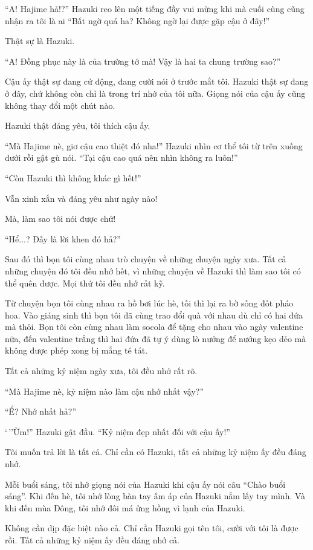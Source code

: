 {``A! Hajime hả!?'' Hazuki reo lên một tiếng đầy vui mừng khi mà cuối
cùng cũng nhận ra tôi là ai ``Bất ngờ quá ha? Không ngờ lại được gặp cậu
ở đây!''

Thật sự là Hazuki.

``A! Đồng phục này là của trường tớ mà! Vậy là hai ta chung trường
sao?''

Cậu ấy thật sự đang cử động, đang cười nói ở trước mắt tôi. Hazuki thật
sự đang ở đây, chứ không còn chỉ là trong trí nhớ của tôi nữa. Giọng nói
của cậu ấy cũng không thay đổi một chút nào.

Hazuki thật đáng yêu, tôi thích cậu ấy.

``Mà Hajime nè, giơ cậu cao thiệt đó nha!'' Hazuki nhìn cơ thể tôi từ
trên xuống dưới rồi gật gù nói. ``Tại cậu cao quá nên nhìn không ra
luôn!''

``Còn Hazuki thì không khác gì hết!''

Vẫn xinh xắn và đáng yêu như ngày nào!

Mà, làm sao tôi nói được chứ!

``Hể...? Đấy là lời khen đó hả?''

Sau đó thì bọn tôi cùng nhau trò chuyện về những chuyện ngày xưa. Tất cả
những chuyện đó tôi đều nhớ hết, vì những chuyện về Hazuki thì làm sao
tôi có thể quên được. Mọi thứ tôi đều nhớ rất kỹ.

Từ chuyện bọn tôi cùng nhau ra hồ bơi lúc hè, tối thì lại ra bờ sống đốt
pháo hoa. Vào giáng sinh thì bọn tôi đã cùng trao đổi quà với nhau dù
chỉ có hai đứa mà thôi. Bọn tôi còn cùng nhau làm socola để tặng cho
nhau vào ngày valentine nữa, đến valentine trắng thì hai đứa đã tự ý
dùng lò nướng để nướng kẹo dẻo mà không được phép xong bị mắng té tát.

Tất cả những kỷ niệm ngày xưa, tôi đều nhớ rất rõ.

``Mà Hajime nè, kỷ niệm nào làm cậu nhớ nhất vậy?''

``Ể? Nhớ nhất hả?''

`\,''Ừm!'' Hazuki gật đầu. ``Kỷ niệm đẹp nhất đối với cậu ấy!''

Tôi muốn trả lời là tất cả. Chỉ cần có Hazuki, tất cả những kỷ niệm ấy
đều đáng nhớ.

Mỗi buổi sáng, tôi nhớ giọng nói của Hazuki khi cậu ấy nói câu ``Chào
buổi sáng''. Khi đến hè, tôi nhớ lòng bàn tay ấm áp của Hazuki nắm lấy
tay mình. Và khi đến mùa Đông, tôi nhớ đôi má ửng hồng vì lạnh của
Hazuki.

Không cần dịp đặc biệt nào cả. Chỉ cần Hazuki gọi tên tôi, cười với tôi
là được rồi. Tất cả những kỷ niệm ấy đều đáng nhớ cả.

}
